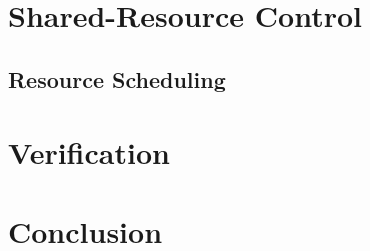 \documentclass[11pt,a4paper]{report}
\begin{document}
{    \section{Shared-Resource Control}
        \subsection{Resource Scheduling}
    \section{Verification}
    \section{Conclusion}
    

\newpage
\cite{openpiton}
\cite{satish2009designing}
\cite{binet2010harnessing}


}
\end{document}
